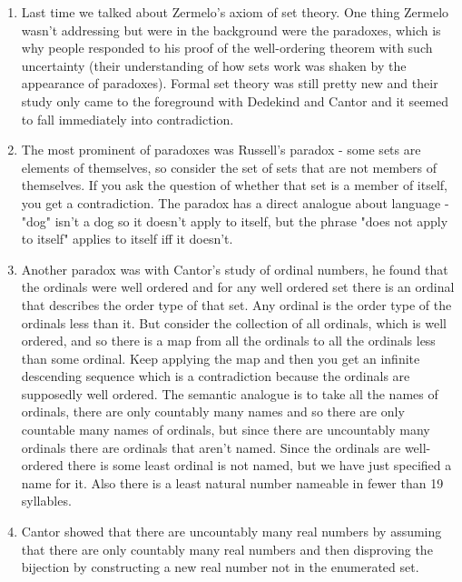 \documentclass[12pt]{article}
\theoremstyle{definition}
\begin{document}
\begin{enumerate}
    \itemsep0em 
    \item
        Last time we talked about Zermelo's axiom of set theory. One thing
        Zermelo wasn't addressing but were in the background were the
        paradoxes, which is why people responded to his proof of the
        well-ordering theorem with such uncertainty (their understanding of how
        sets work was shaken by the appearance of paradoxes). Formal set theory
        was still pretty new and their study only came to the foreground with
        Dedekind and Cantor and it seemed to fall immediately into
        contradiction.
    \item
        The most prominent of paradoxes was Russell's paradox - some sets are
        elements of themselves, so consider the set of sets that are not
        members of themselves. If you ask the question of whether that set is a
        member of itself, you get a contradiction. The paradox has a direct
        analogue about language - "dog" isn't a dog so it doesn't apply to
        itself, but the phrase "does not apply to itself" applies to itself iff
        it doesn't.
    \item
        Another paradox was with Cantor's study of ordinal numbers, he found
        that the ordinals were well ordered and for any well ordered set there
        is an ordinal that describes the order type of that set. Any ordinal is
        the order type of the ordinals less than it. But consider the
        collection of all ordinals, which is well ordered, and so there is a
        map from all the ordinals to all the ordinals less than some ordinal.
        Keep applying the map and then you get an infinite descending sequence
        which is a contradiction because the ordinals are supposedly well
        ordered. The semantic analogue is to take all the names of ordinals,
        there are only countably many names and so there are only countable
        many names of ordinals, but since there are uncountably many ordinals
        there are ordinals that aren't named. Since the ordinals are
        well-ordered there is some least ordinal is not named, but we have just
        specified a name for it. Also there is a least natural number nameable
        in fewer than 19 syllables. 
    \item
        Cantor showed that there are uncountably many real numbers by assuming
        that there are only countably many real numbers and then disproving the
        bijection by constructing a new real number not in the enumerated set.

\end{enumerate}
\end{document}
